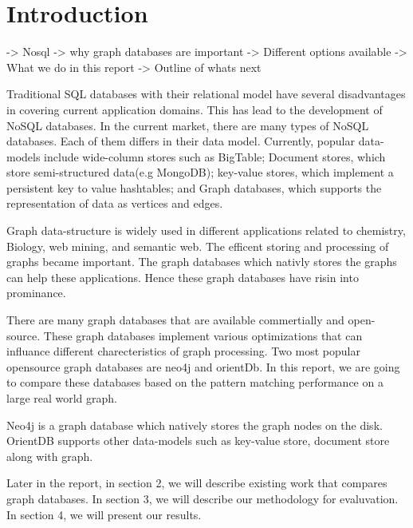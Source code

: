 \section{Introduction}

-> Nosql 
-> why graph databases are important
-> Different options available
-> What we do in this report
-> Outline of whats next

Traditional SQL databases with their relational model have several disadvantages in covering current application domains. This has lead to the development of NoSQL databases. In the current market, there are many types of NoSQL databases. Each of them differs in their data model. Currently, popular data-models include wide-column stores such as BigTable; Document stores, which store semi-structured data(e.g MongoDB); key-value stores, which implement a persistent key to value hashtables; and Graph databases, which supports the representation of data as vertices and edges.

Graph data-structure is widely used in different applications related to chemistry, Biology, web mining, and semantic web. The efficent storing and processing of graphs became important. The graph databases which nativly stores the graphs can help these applications. Hence these graph databases have risin into prominance.

There are many graph databases that are available commertially and open-source. These graph databases implement various optimizations that can influance different charecteristics of graph processing. Two most popular opensource graph databases are neo4j and orientDb. In this report, we are going to compare these databases based on the pattern matching performance on a large real world graph. 

Neo4j is a graph database which natively stores the graph nodes on the disk. OrientDB supports other data-models such as key-value store, document store along with graph. 


Later in the report, in section 2, we will describe existing work that compares graph databases. In section 3, we will describe our methodology for evaluvation. In section 4, we will present our results.   




